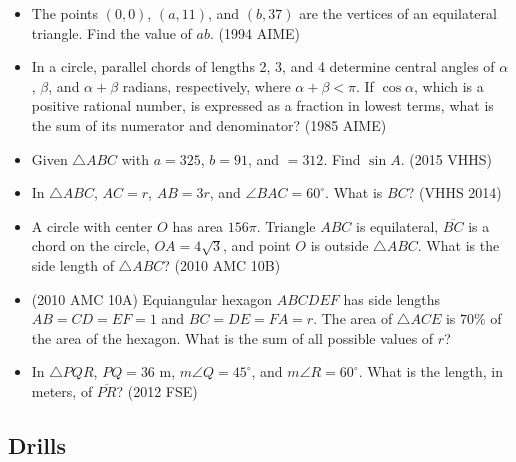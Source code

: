 \documentclass{article}
\begin{document}
\begin{itemize}
\item The points $(0,0)$, $(a,11)$, and $(b,37)$ are the vertices of an equilateral triangle. Find the value of $ab$. (1994 AIME)

\item In a circle, parallel chords of lengths 2, 3, and 4 determine central angles of $\alpha$, $\beta$, and $\alpha+\beta$ radians, respectively, where $\alpha+\beta < \pi$. If $\cos \alpha$, which is a positive rational number, is expressed as a fraction in lowest terms, what is the sum of its numerator and denominator? (1985 AIME)

\item Given $\triangle ABC$ with $a=325$, $b=91$, and $=312$. Find $\sin A$. (2015 VHHS)

\item In $\triangle ABC$, $AC=r$, $AB=3r$, and $\angle BAC=60^\circ$. What is $BC$? (VHHS 2014)

\item A circle with center $O$ has area $156\pi$. Triangle $ABC$ is equilateral, $\overline{BC}$ is a chord on the circle, $OA = 4\sqrt{3}$, and point $O$ is outside $\triangle ABC$. What is the side length of $\triangle ABC$? (2010 AMC 10B)

\item (2010 AMC 10A) Equiangular hexagon $ABCDEF$ has side lengths $AB=CD=EF=1$ and $BC=DE=FA=r$. The area of $\triangle ACE$ is $70\%$ of the area of the hexagon. What is the sum of all possible values of $r$?

\item In $\triangle PQR$, $PQ=36$ m, $m\angle Q=45^\circ$, and $m\angle R=60^\circ$. What is the length, in meters, of $\overline{PR}$? (2012 FSE)

\end{itemize}

\subsection{Drills}
\end{document}
